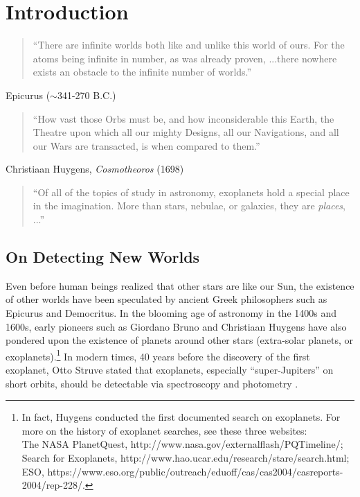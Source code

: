 \chapter{Introduction}\label{chap:introduction}

\begin{quote}
``There are infinite worlds both like and unlike this world of
ours. For the atoms being infinite in number, as was already proven,
...there nowhere exists an obstacle to the infinite number of worlds.''
\end{quote}
\hfill Epicurus ($\sim$341-270 B.C.)

\begin{quote}
``How vast those Orbs must be, and how inconsiderable this Earth, the
Theatre upon which all our mighty Designs, all our Navigations, and
all our Wars are transacted, is when compared to them.''
\end{quote}
\hfill Christiaan Huygens, {\it Cosmotheoros} (1698)

\begin{quote}
``Of all of the topics of study in astronomy, exoplanets hold a
special place in the imagination. More than stars, nebulae, or
galaxies, they are {\it places}, ...''
\end{quote}
\hfill \cite{2006PhDT.........8W}

\section{On Detecting New Worlds}

Even before human beings realized that other stars are like our Sun,
the existence of other worlds have been speculated by ancient Greek
philosophers such as Epicurus and Democritus. In the blooming age of
astronomy in the 1400s and 1600s, early pioneers such as Giordano
Bruno and Christiaan Huygens have also pondered upon the existence of
planets around other stars (extra-solar planets, or
exoplanets).\footnote{In fact, Huygens conducted the first documented
search on exoplanets. For more on the history of exoplanet searches,
see these three websites:\\ The NASA PlanetQuest,
http://www.nasa.gov/externalflash/PQTimeline/; \\ Search for
Exoplanets, http://www.hao.ucar.edu/research/stare/search.html; \\
ESO,
https://www.eso.org/public/outreach/eduoff/cas/cas2004/casreports-2004/rep-228/. }
In modern times, 40 years before the discovery of the first exoplanet,
Otto Struve stated that exoplanets, especially ``super-Jupiters'' on
short orbits, should be detectable via spectroscopy and photometry
\citep{1952Obs....72..199S}.


